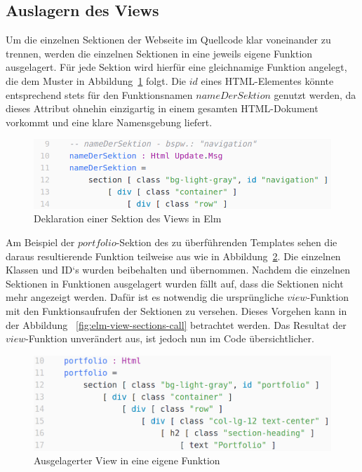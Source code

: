 \subsection{Auslagern des Views}
\label{sec:auslagern-des-views}
Um die einzelnen Sektionen der Webseite im Quellcode klar voneinander zu trennen, werden die einzelnen Sektionen in eine jeweils eigene Funktion ausgelagert.
Für jede Sektion wird hierfür eine gleichnamige Funktion angelegt, die dem Muster in Abbildung~\ref{fig:elm-view-section} folgt. Die $id$ eines \ac{HTML}-Elementes könnte entsprechend stets für den Funktionsnamen $nameDerSektion$ genutzt werden, da dieses Attribut ohnehin einzigartig in einem gesamten \ac{HTML}-Dokument vorkommt und eine klare Namensgebung liefert.
\begin{figure}[htb]
\centering
\includegraphics[scale=0.53]{img/elm-html-sections.png}
\caption{Deklaration einer Sektion des Views in Elm}\label{fig:elm-view-section}
\end{figure}
Am Beispiel der $portfolio$-Sektion des zu überführenden Templates sehen die daraus resultierende Funktion teilweise aus wie in Abbildung~\ref{fig:elm-view-section-function}. Die einzelnen Klassen und ID`s wurden beibehalten und übernommen. Nachdem die einzelnen Sektionen in Funktionen ausgelagert wurden fällt auf, dass die Sektionen nicht mehr angezeigt werden. Dafür ist es notwendig die ursprüngliche $view$-Funktion mit den Funktionsaufrufen der Sektionen zu versehen. Dieses Vorgehen kann in der Abbildung ~\ref{fig:elm-view-sections-call} betrachtet werden. Das Resultat der $view$-Funktion unverändert aus, ist jedoch nun im Code übersichtlicher.
\begin{figure}[h]
\centering
\includegraphics[scale=0.41]{img/elm-view-portfolio-section-function.png}
\caption{Ausgelagerter View in eine eigene Funktion}\label{fig:elm-view-section-function}
\end{figure}

